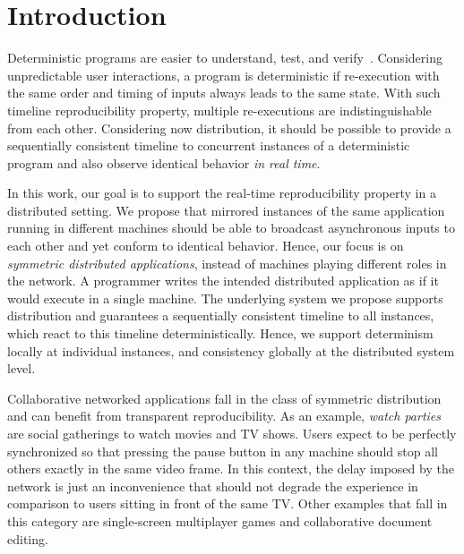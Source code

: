 \documentclass[sigplan,screen]{acmart}
\begin{document}

\maketitle

\section{Introduction}

Deterministic programs are easier to understand, test, and verify~\cite{det}.
Considering unpredictable user interactions, a program is deterministic if
re-execution with the same order and timing of inputs always leads to the same
state.
With such timeline reproducibility property, multiple re-executions are
indistinguishable from each other.
Considering now distribution, it should be possible to provide a
sequentially consistent timeline to concurrent instances of a deterministic
program and also observe identical behavior \emph{in real time}.

In this work, our goal is to support the real-time reproducibility property in
a distributed setting.
We propose that mirrored instances of the same application running in different
machines should be able to broadcast asynchronous inputs to each other and yet
conform to identical behavior.
Hence, our focus is on \emph{symmetric distributed applications}, instead of
machines playing different roles in the network.
A programmer writes the intended distributed application as if it would execute
in a single machine.
The underlying system we propose supports distribution and guarantees a
sequentially consistent timeline to all instances, which react to this timeline
deterministically.
Hence, we support determinism locally at individual instances, and consistency
globally at the distributed system level.

Collaborative networked applications fall in the class of symmetric
distribution and can benefit from transparent reproducibility.
As an example, \emph{watch parties} are social gatherings to watch movies and
TV shows.
Users expect to be perfectly synchronized so that pressing the pause button in
any machine should stop all others exactly in the same video frame.
In this context, the delay imposed by the network is just an inconvenience that
should not degrade the experience in comparison to users sitting in front of
the same TV.
Other examples that fall in this category are single-screen multiplayer games
and collaborative document editing.
\end{document}
